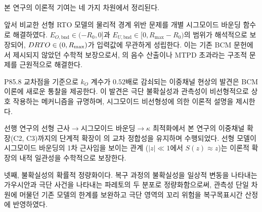 \subsection{}
\label{subsec:ch5_theoretical}

본 연구의 이론적 기여는 네 가지 차원에서 정리된다.

앞서 비교한 선형 RTO 모델의 물리적 경계 위반 문제를 개별 시그모이드
바운딩 함수로 해결하였다. $E_{O,\text{bnd}} \in (-R_0, 0]$과
$E_{U,\text{bnd}} \in [0, R_{\max} - R_0)$의 범위가 해석적으로 보장되어,
$DRTO \in (0, R_{\max})$가 입력값에 무관하게 성립한다.
이는 기존 BCM 문헌에서 제시되지 않았던 수학적 보장으로서,
의 음수 산출이나 MTPD 초과라는 구조적 문제를
근원적으로 해결한다.

P85.8 교차점을 기준으로 $k_O$ 계수가 $0.52$배로 감쇠되는
이중채널 현상의 발견은 BCM 이론에 새로운 통찰을 제공한다.
이 발견은 극단 불확실성과 관측성이 비선형적으로 상호 작용하는
메커니즘을 규명하며, 시그모이드 비선형성에 의한 이론적 설명을
제시한다.

선행 연구\citep{lee2026drto}의 선형 근사$\to$시그모이드 바운딩$\to$$\kappa$ 최적화에서
본 연구의 이중채널 확장(C2, C3)까지의 단계적 확장이
의 교차 정합성을 유지하며 수행되었다.
선형 모델이 시그모이드 바운딩의 1차 근사임을 보이는 관계
($|z| \ll 1$에서 $S(z) \approx z$)는 이론적 확장의
내적 일관성을 수학적으로 보장한다.

  넷째, 불확실성의 확률적 정량화이다. 복구 과정의 불확실성을 일상적 변동을 나타내는 가우시안과 극단 사건을 나타내는 파레토의 두 분포로 정량화함으로써, 관측성 단일 차원에 머물던 기존 모델의 한계를 보완하고 극단 영역의 꼬리 위험을 복구목표시간 산정에 반영하였다.

